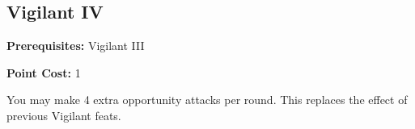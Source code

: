 \subsection{Vigilant IV}\label{feat:vigilant4}

\noindent
\textbf{Prerequisites:} Vigilant III

\noindent
\textbf{Point Cost:} 1

You may make 4 extra opportunity attacks per round. This replaces the effect
of previous Vigilant feats.
